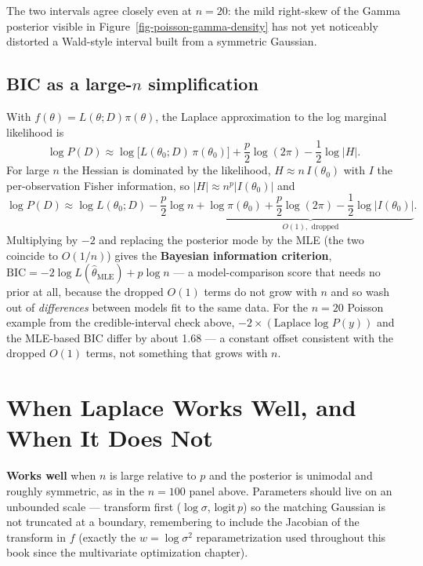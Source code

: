 \documentclass[
  letterpaper,
  DIV=11,
  numbers=noendperiod]{scrreprt}
\begin{document}
The two intervals agree closely even at \(n=20\): the mild right-skew of
the Gamma posterior visible in Figure~\ref{fig-poisson-gamma-density}
has not yet noticeably distorted a Wald-style interval built from a
symmetric Gaussian.

\subsection{\texorpdfstring{BIC as a large-\(n\)
simplification}{BIC as a large-n simplification}}\label{bic-as-a-large-n-simplification}

With \(f(\theta) = L(\theta;D)\pi(\theta)\), the Laplace approximation
to the log marginal likelihood is \[
\log P(D) \approx \log\big[L(\theta_0;D)\,\pi(\theta_0)\big] + \frac p2\log(2\pi) - \frac12\log|H|.
\] For large \(n\) the Hessian is dominated by the likelihood,
\(H \approx
n\,I(\theta_0)\) with \(I\) the per-observation Fisher information, so
\(|H|
\approx n^p|I(\theta_0)|\) and \[
\log P(D) \approx \log L(\theta_0;D) - \frac p2\log n
 + \underbrace{\log\pi(\theta_0) + \frac p2\log(2\pi) - \frac12\log|I(\theta_0)|}_{O(1),\text{ dropped}}.
\] Multiplying by \(-2\) and replacing the posterior mode by the MLE
(the two coincide to \(O(1/n)\)) gives the \textbf{Bayesian information
criterion}, \(\text{BIC} = -2\log L(\hat\theta_{\text{MLE}}) + p\log n\)
--- a model-comparison score that needs no prior at all, because the
dropped \(O(1)\) terms do not grow with \(n\) and so wash out of
\emph{differences} between models fit to the same data. For the \(n=20\)
Poisson example from the credible-interval check above,
\(-2\times(\text{Laplace log }P(y))\) and the MLE-based BIC differ by
about 1.68 --- a constant offset consistent with the dropped \(O(1)\)
terms, not something that grows with \(n\).

\section{When Laplace Works Well, and When It Does
Not}\label{when-laplace-works-well-and-when-it-does-not}

\textbf{Works well} when \(n\) is large relative to \(p\) and the
posterior is unimodal and roughly symmetric, as in the \(n=100\) panel
above. Parameters should live on an unbounded scale --- transform first
(\(\log\sigma\), \(\text{logit}\,p\)) so the matching Gaussian is not
truncated at a boundary, remembering to include the Jacobian of the
transform in \(f\) (exactly the \(w=\log\sigma^2\) reparametrization
used throughout this book since the multivariate optimization chapter).
\end{document}

